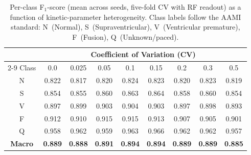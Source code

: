 \documentclass[journal=asbcd6,manuscript=suppinfo]{achemso}
\begin{document}
\begin{table}[H]
    \centering
    \caption{Per-class F$_1$-score (mean across seeds, five-fold CV with RF readout) as a function of kinetic-parameter heterogeneity.
    Class labels follow the AAMI standard: N~(Normal), S~(Supraventricular), V~(Ventricular premature), F~(Fusion), Q~(Unknown/paced).}\label{tab:heterogeneity-per-class}
    \small
    \begin{tabular}{ccccccccc}
        \toprule
        & \multicolumn{8}{c}{Coefficient of Variation (CV)} \\
        \cmidrule(lr){2-9}
        Class & 0.0 & 0.025 & 0.05 & 0.1 & 0.15 & 0.2 & 0.3 & 0.5 \\
        \midrule
        N & 0.822 & 0.817 & 0.820 & 0.824 & 0.823 & 0.820 & 0.823 & 0.819 \\
        S & 0.854 & 0.855 & 0.860 & 0.863 & 0.864 & 0.858 & 0.860 & 0.854 \\
        V & 0.897 & 0.899 & 0.903 & 0.904 & 0.903 & 0.897 & 0.898 & 0.893 \\
        F & 0.912 & 0.910 & 0.915 & 0.915 & 0.913 & 0.907 & 0.905 & 0.901 \\
        Q & 0.958 & 0.962 & 0.959 & 0.963 & 0.966 & 0.962 & 0.962 & 0.957 \\
        \midrule
        \textbf{Macro} & \textbf{0.889} & \textbf{0.888} & \textbf{0.891} & \textbf{0.894} & \textbf{0.894} & \textbf{0.889} & \textbf{0.889} & \textbf{0.885} \\
        \bottomrule
    \end{tabular}
\end{table}

\end{document}

